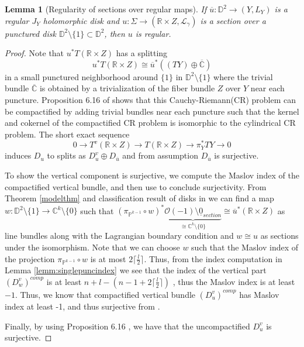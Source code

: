 \documentclass[11pt, oneside,dvipsnames]{amsart}
\newcommand{\of}{\circ}
\renewcommand{\to}{\rightarrow}
\renewcommand{\to}{\rightarrow}
\newcommand{\<}{\langle}
\renewcommand{\>}{\rangle}
\newcommand{\bC}{\mathbb{C}}
\newcommand{\bD}{\mathbb{D}}
\newcommand{\bP}{\mathbb{P}}
\newcommand{\bR}{\mathbb{R}}
\newcommand{\cL}{\mathcal{L}}
\newcommand{\cO}{\mathcal{O}}
\newcommand{\sm}{\ensuremath{\setminus}}
\renewcommand{\to}{\rightarrow}
\newtheorem{lemma}[Theorem]{Lemma}
\theoremstyle{definition}
\theoremstyle{definition}
\numberwithin{equation}{subsection}
\begin{document}
\begin{lemma}[Regularity of sections over regular maps]\label{regularityfromregularity}
    If  $\overline{u} :\bD^2 \to (Y,L_Y)$ is a regular $J_Y$ holomorphic disk and $u: \Sigma \to (\bR \times Z, \cL_\gamma)$ is a section over a punctured disk $\bD^2 \sm \{1 \} \subset \bD^2$, then $u$ is regular.
\end{lemma}
\begin{proof}
    Note that $u^*T(\bR \times Z)$ has a splitting $$u^*T(\bR \times Z) \cong \overline{u}^* ((TY) \oplus  \overline{\bC}) $$ in a small punctured neighborhood around $\{1\}$ in  $\bD^2\sm \{1\}$ where the trivial bundle $\overline{\bC}$ is obtained by a trivialization of the fiber bundle $Z$ over $Y$ near each puncture.
    Proposition 6.16 of \cite{PW19} shows that this Cauchy-Riemann(CR) problem can be compactified by adding trivial bundles near each puncture such that the kernel and cokernel of the compactified CR problem is isomorphic to the cylindrical CR problem. 
    The short exact sequence 
    $$0 \to T^v{(\bR \times Z)} \to T(\bR \times Z) \to \pi_Y^* TY \to 0$$ induces  $D_u$ to splits as $D_u^v \oplus D_{\overline{u}}$ and from assumption $D_{\overline{u}}$ is surjective. 
    
    To show the vertical component is surjective, we compute the Maslov index of the compactified vertical bundle, and then use \cite{riemHilb} to conclude surjectivity. From Theorem \ref{modelthm} and classification result of disks in \cite[\S 6.3]{Cha23} we can find a map $w:\bD^2\sm \{ 1\} \to \bC^k\sm \{ 0 \}$ such that $(\pi_{\bP^{k-1}} \of w) ^* \underbrace{\cO(-1)\sm{\underline{0}_{section}}}_{\cong \bC^k \sm \{ 0\}} \cong \overline{u}^* ({\bR \times Z}) $ as line bundles along with the Lagrangian boundary condition and $w \cong u$ as sections under the isomorphism. Note that we can choose $w$ such that the Maslov index of the projection $\pi_{\bP^{k-1}} \of w$ is at most $2\lceil\frac{l}{2}\rceil$. Thus, from the index computation in Lemma \ref{lemm:singlepuncindex} we see that the index of the vertical part $(D^v_w)^{comp}$ is at least $n+l - (n-1 + 2\lceil\frac{l}{2}\rceil  )$ , thus the Maslov index is at least $-1.$ Thus, we know that compactified vertical bundle $(D^v_u)^{comp}$ has Maslov index at least -1, and thus surjective from \cite{riemHilb}.


    
    \noindent 
    Finally, by using Proposition 6.16 \cite{PW19}, we have that the uncompactified $D^v_u$ is surjective.
    \end{proof}
\end{document}
